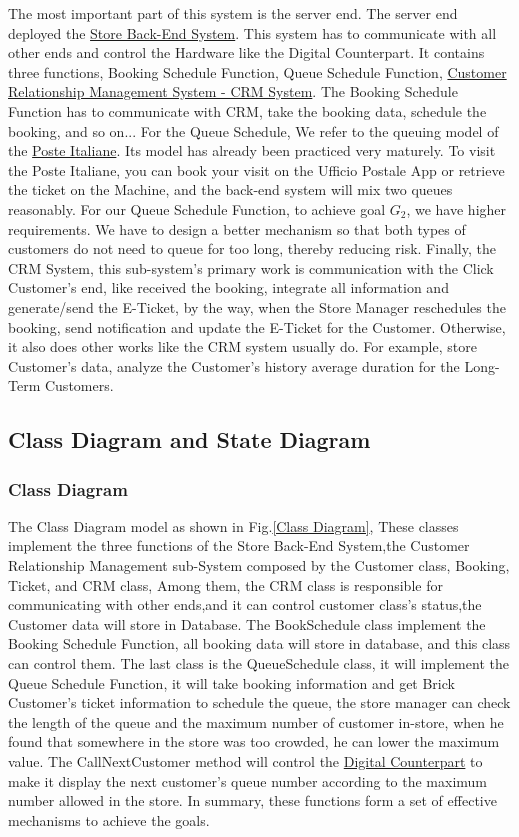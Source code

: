 \documentclass[a4paper,12pt]{report}
\begin{document}
The most important part of this system is the server end. The server end deployed the \hyperref[Definitions]{Store Back-End System}. This system has to communicate with all other ends and control the Hardware like the Digital Counterpart. It contains three functions, Booking Schedule Function, Queue Schedule Function, \hyperref[Reference documents]{Customer Relationship Management System - CRM System}. The Booking Schedule Function has to communicate with CRM, take the booking data, schedule the booking, and so on... For the Queue Schedule, We refer to the queuing model of the \hyperref[Reference documents]{Poste Italiane}. Its model has already been practiced very maturely. To visit the Poste Italiane, you can book your visit on the Ufficio Postale App or retrieve the ticket on the Machine, and the back-end system will mix two queues reasonably. For our Queue Schedule Function, to achieve goal $G_2$, we have higher requirements. We have to design a better mechanism so that both types of customers do not need to queue for too long, thereby reducing risk. Finally, the CRM System, this sub-system's primary work is communication with the Click Customer's end, like received the booking, integrate all information and generate/send the E-Ticket, by the way, when the Store Manager reschedules the booking, send notification and update the E-Ticket for the Customer. Otherwise, it also does other works like the CRM system usually do. For example, store Customer's data, analyze the Customer's history average duration for the  Long-Term Customers.


\subsection{Class Diagram and State Diagram}
\subsubsection{Class Diagram}
The Class Diagram model as shown in Fig.\ref{Class Diagram}, These classes implement the three functions of the Store Back-End System,the Customer Relationship Management sub-System composed by the  Customer class, Booking, Ticket, and CRM class, Among them, the CRM class is responsible for communicating with other ends,and it can control customer class's status,the Customer data will store in Database. The BookSchedule class implement the Booking Schedule Function, all booking data will store in database, and this class can control them. The last class is the QueueSchedule class, it will implement the Queue Schedule Function, it will take booking information and get Brick Customer's ticket information to schedule the queue, the store manager can check the length of the queue and the maximum number of customer in-store, when he found that somewhere in the store was too crowded, he can lower the maximum value. The CallNextCustomer method will control the \hyperref[Definitions]{Digital Counterpart} to make it display the next customer's queue number according to the maximum number allowed in the store. In summary, these functions form a set of effective mechanisms to achieve the goals.
\end{document}
